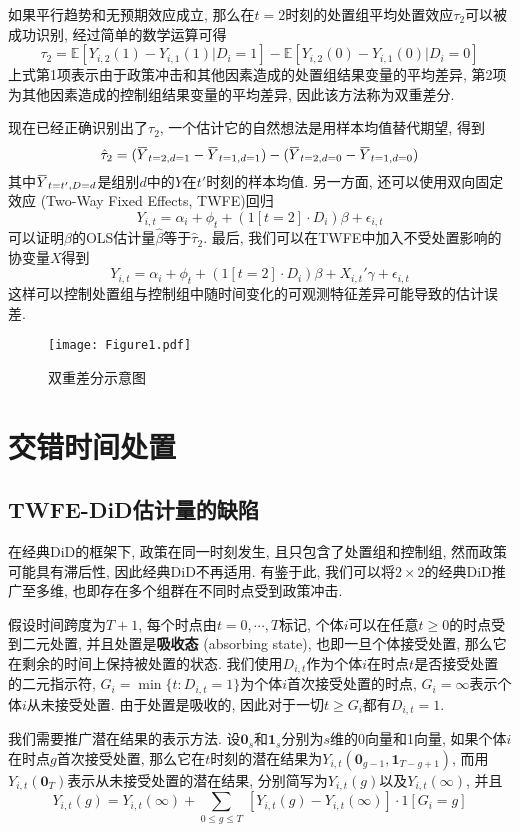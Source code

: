 \documentclass[cn,sakura,14pt,screen,bibstyle=gb7714-2015,math=mtpro2]{elegantnote}
\newcommand{\E}{\mathbb{E}}
\newcommand{\overbar}[1]{\mkern 1.5mu\overline{\mkern-1.5mu#1\mkern-1.5mu}\mkern 1.5mu}
\begin{document}
如果平行趋势和无预期效应成立, 那么在$t=2$时刻的处置组平均处置效应$\tau_2$可以被成功识别, 经过简单的数学运算可得
$$\tau_2=\E[Y_{i,2}(1)-Y_{i,1}(1)|D_i=1]-\E[Y_{i,2}(0)-Y_{i,1}(0)|D_i=0]$$
上式第1项表示由于政策冲击和其他因素造成的处置组结果变量的平均差异, 第2项为其他因素造成的控制组结果变量的平均差异, 因此该方法称为双重差分.

现在已经正确识别出了$\tau_2$, 一个估计它的自然想法是用样本均值替代期望, 得到
$$\hat{\tau}_2=(\overbar{Y}_{t=2,d=1}-\overbar{Y}_{t=1,d=1})-(\overbar{Y}_{t=2,d=0}-\overbar{Y}_{t=1,d=0})$$
其中$\overbar{Y}_{t=t',D=d}$是组别$d$中的$Y$在$t'$时刻的样本均值. 另一方面, 还可以使用双向固定效应 (Two-Way Fixed Effects, TWFE)回归
$$Y_{i,t}=\alpha_i+\phi_t+(1[t=2]\cdot D_i)\beta+\epsilon_{i,t}$$
可以证明$\beta$的OLS估计量$\hat{\beta}$等于$\hat{\tau}_2$. 最后, 我们可以在TWFE中加入不受处置影响的协变量$X$得到
$$Y_{i,t}=\alpha_i+\phi_t+(1[t=2]\cdot D_i)\beta+{X}_{i,t}'\gamma+\epsilon_{i,t}$$
这样可以控制处置组与控制组中随时间变化的可观测特征差异可能导致的估计误差.

\begin{figure}
  \centering
  \texttt{[image: Figure1.pdf]}
  \caption{双重差分示意图}
\end{figure}
\newpage
\section{交错时间处置}
\subsection{TWFE-DiD估计量的缺陷}
在经典DiD的框架下, 政策在同一时刻发生, 且只包含了处置组和控制组, 然而政策可能具有滞后性, 因此经典DiD不再适用. 有鉴于此, 我们可以将$2\times2$的经典DiD推广至多维, 也即存在多个组群在不同时点受到政策冲击.

假设时间跨度为$T+1$, 每个时点由$t=0,\cdots,T$标记, 个体$i$可以在任意$t\ge0$的时点受到二元处置, 并且处置是\textbf{吸收态} (absorbing state), 也即一旦个体接受处置, 那么它在剩余的时间上保持被处置的状态. 我们使用$D_{i,t}$作为个体$i$在时点$t$是否接受处置的二元指示符, $G_i=\min\{t:D_{i,t}=1\}$为个体$i$首次接受处置的时点, $G_i=\infty$表示个体$i$从未接受处置. 由于处置是吸收的, 因此对于一切$t\ge G_i$都有$D_{i,t}=1$.

我们需要推广潜在结果的表示方法. 设$\mathbf{0}_s$和$\mathbf{1}_s$分别为$s$维的0向量和1向量, 如果个体$i$在时点$g$首次接受处置, 那么它在$t$时刻的潜在结果为$Y_{i,t}(\mathbf{0}_{g-1},\mathbf{1}_{T-g+1})$, 而用$Y_{i,t}(\mathbf{0}_T)$表示从未接受处置的潜在结果, 分别简写为$Y_{i,t}(g)$以及$Y_{i,t}(\infty)$, 并且
$$Y_{i,t}(g)=Y_{i,t}(\infty)+\sum_{0\leq g\leq T}\,[Y_{i,t}(g)-Y_{i,t}(\infty)]\cdot 1[G_i=g]$$
\end{document}
